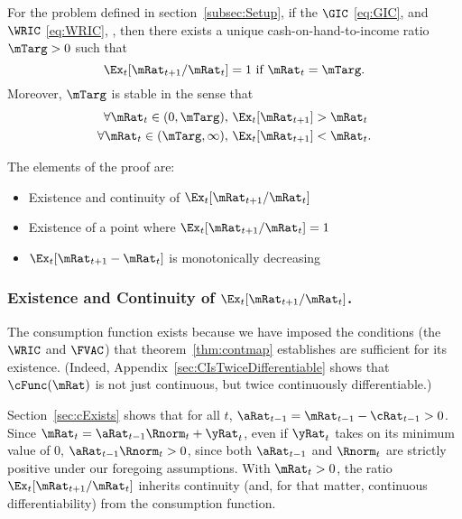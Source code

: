 \documentclass[BufferStockTheory]{subfiles}
\begin{document}
\begin{theorem}
  \label{thm:target} For the problem defined in section~\ref{subsec:Setup}, 
  if the $\GIC$ \eqref{eq:GIC}, and $\WRIC$ \eqref{eq:WRIC}, 
  , then there exists a unique cash-on-hand-to-income ratio $\mTarg>0$ such that
  \begin{equation}  
    \Ex_t [{\mRat}_{t+1}/\mRat_t] = 1 \mbox{~if~} \mRat_t = \mTarg. 
    \label{eq:mTarget}
  \end{equation}
  Moreover, $\mTarg$ is stable in the sense that
  \begin{align}\label{eq:stability}
    \forall {\mRat}_t\in(0,\mTarg),      \,\,& \Ex_t [{\mRat}_{t+1}] > {\mRat}_t  \\
    \forall {\mRat}_t\in(\mTarg,\infty), \,\,& \Ex_t [{\mRat}_{t+1}] < {\mRat}_t. \notag
  \end{align}


\end{theorem}

The elements of the proof are:
\begin{itemize}
\item Existence and continuity of $\Ex_t [{\mRat}_{t+1}/\mRat_t]$
\item Existence of a point where $\Ex_t [{\mRat}_{t+1}/\mRat_t] = 1$
 \item $\Ex_t [{\mRat}_{t+1}-\mRat_{t}]$ is monotonically decreasing
\end{itemize}

\subsubsection{Existence and Continuity of $\Ex_t [{\mRat}_{t+1}/\mRat_t]$.}
The consumption function exists because we have imposed the conditions (the $\WRIC$ and $\FVAC$) that theorem~\ref{thm:contmap} establishes are sufficient for its existence.  (Indeed, Appendix~\ref{sec:CIsTwiceDifferentiable} shows that $\cFunc(\mRat)$ is not just continuous, but twice continuously differentiable.)

Section~\ref{sec:cExists} shows that for all $t$, $\aRat_{t-1} = {\mRat}_{t-1} -  \cRat_{t-1} > 0$.  Since ${\mRat}_{t}= {\aRat}_{t-1} \Rnorm_{t} + \yRat_{t}$, even if $\yRat_{t}$ takes on its minimum value of 0, $\aRat_{t-1} \Rnorm_{t} > 0$, since both $\aRat_{t-1}$ and $\Rnorm_{t}$ are strictly positive under our foregoing assumptions.  With $\mRat_{t} > 0$, the ratio $\Ex_t [{\mRat}_{t+1}/\mRat_t]$ inherits continuity (and, for that matter, continuous differentiability) from the consumption function.
\end{document}
